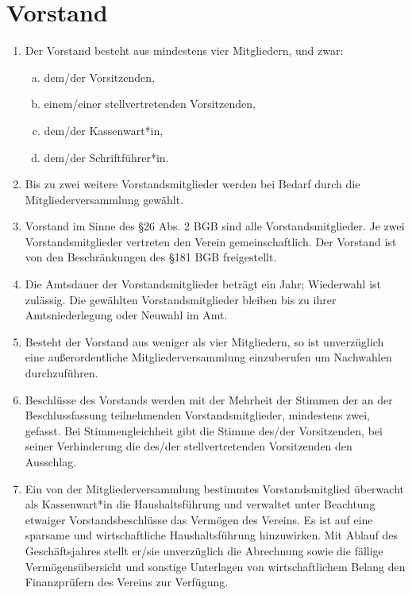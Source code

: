 \documentclass[a4paper]{article}
\begin{document}
\section{Vorstand}
\begin{enumerate}
	\item Der Vorstand besteht aus mindestens vier Mitgliedern, und zwar:
	\begin{enumerate}[a)]
		\item dem/der Vorsitzenden,
		\item einem/einer stellvertretenden Vorsitzenden,
		\item dem/der Kassenwart*in,
		\item dem/der Schriftführer*in.
	\end{enumerate}

	\item Bis zu zwei weitere Vorstandsmitglieder werden bei Bedarf durch die Mitgliederversammlung gewählt.

	\item Vorstand im Sinne des §26 Abs. 2 BGB sind alle Vorstandsmitglieder. Je zwei Vorstandsmitglieder vertreten den Verein gemeinschaftlich. Der Vorstand ist von den Beschränkungen des §181 BGB freigestellt.

	\item Die Amtsdauer der Vorstandsmitglieder beträgt ein Jahr; Wiederwahl ist zulässig. Die gewählten Vorstandsmitglieder bleiben bis zu ihrer Amtsniederlegung oder Neuwahl im Amt.

	\item Besteht der Vorstand aus weniger als vier Mitgliedern, so ist unverzüglich eine außerordentliche Mitgliederversammlung einzuberufen um Nachwahlen durchzuführen.

	\item Beschlüsse des Vorstands werden mit der Mehrheit der Stimmen der an der Beschlussfassung teilnehmenden Vorstandsmitglieder, mindestens zwei, gefasst. Bei Stimmengleichheit gibt die Stimme des/der Vorsitzenden, bei seiner Verhinderung die des/der stellvertretenden Vorsitzenden den Ausschlag.

	\item Ein von der Mitgliederversammlung bestimmtes Vorstandsmitglied überwacht als Kassenwart*in die Haushaltsführung und verwaltet unter Beachtung etwaiger Vorstandsbeschlüsse das Vermögen des Vereins. Es ist auf eine sparsame und wirtschaftliche Haushaltsführung hinzuwirken. Mit Ablauf des Geschäftsjahres stellt er/sie unverzüglich die Abrechnung sowie die fällige Vermögensübersicht und sonstige Unterlagen von wirtschaftlichem Belang den Finanzprüfern des Vereins zur Verfügung.


\end{enumerate}
\end{document}
